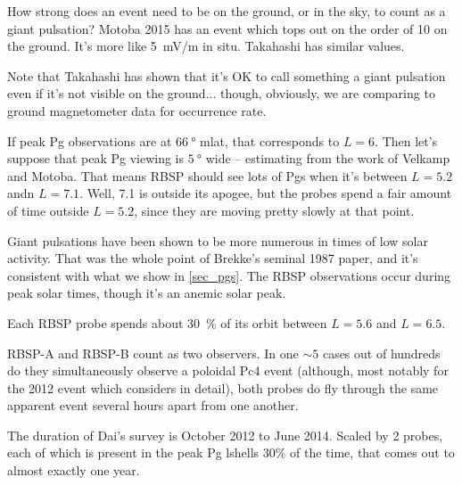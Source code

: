 How strong does an event need to be on the ground, or in the sky, to count as a giant pulsation? Motoba 2015\cite{motoba_2015} has an event which tops out on the order of \SI{10}{\nT} on the ground. It's more like \SI{5}{\mV/\m} in situ. Takahashi\cite{takahashi_2011} has similar values. 

Note that Takahashi\cite{takahashi_2013} has shown that it's OK to call something a giant pulsation even if it's not visible on the ground... though, obviously, we are comparing to ground magnetometer data for occurrence rate. 

If peak Pg observations are at $\SI{66}{\degree}$ mlat, that corresponds to $L = 6$. Then let's suppose that peak Pg viewing is $\SI{5}{\degree}$ wide -- estimating from the work of Velkamp and Motoba. That means RBSP should see lots of Pgs when it's between $L = 5.2$ andn $L = 7.1$. Well, \SI{7.1}{\RE} is outside its apogee, but the probes spend a fair amount of time outside $L = 5.2$, since they are moving pretty slowly at that point. 

Giant pulsations have been shown to be more numerous in times of low solar activity. That was the whole point of Brekke's seminal 1987 paper, and it's consistent with what we show in \cref{sec_pgs}. The RBSP observations occur during peak solar times, though it's an anemic solar peak\cite{pesnell_2016}. 


Each RBSP probe spends about \SI{30}{\percent} of its orbit between $L = 5.6$ and $L = 6.5$. 

RBSP-A and RBSP-B count as two observers. In one $\sim 5$ cases out of hundreds do they simultaneously observe a poloidal Pc4 event (although, most notably for the 2012 event which \cite{dai_2013} considers in detail), both probes do fly through the same apparent event several hours apart from one another. 

The duration of Dai's survey is October 2012 to June 2014. Scaled by 2 probes, each of which is present in the peak Pg lshells 30\% of the time, that comes out to almost exactly one year. 









